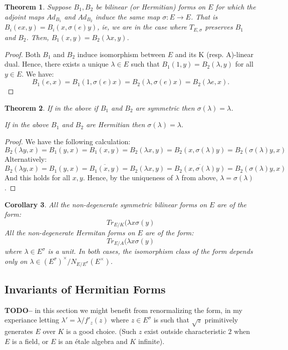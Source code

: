 \documentclass{article}
\theoremstyle{plain}
\newtheorem{theorem}{Theorem}[section]
\newtheorem{corollary}[theorem]{Corollary}
\theoremstyle{definition}
\newcommand{\TODO}[1]{\textbf{TODO-#1}}
\begin{document}
\begin{theorem}
Suppose $B_1,B_2$ be bilinear (or Hermitian) forms on $E$ for which the adjoint maps $Ad_{B_1}$ and $Ad_{B_2}$ induce the same map $\sigma:E\rightarrow E$.
That is $B_i(ex,y) = B_i(x,\sigma(e)y)$, ie, we are in the case where $T_{E,\sigma}$ preserves $B_1$ and $B_2$.
Then, $B_1(x,y) = B_2(\lambda x,y)$.
\end{theorem}
\begin{proof}
Both $B_1$ and $B_2$ induce isomorphism between $E$ and its K (resp. A)-linear dual.
Hence, there exists a unique $\lambda\in E$ such that $B_1(1,y) = B_2(\lambda,y)$ for all $y\in E$.
We have:
\[ B_1(e,x) = B_1(1,\sigma(e)x) = B_2(\lambda,\sigma(e)x) = B_2(\lambda e,x). \]
\end{proof}
\begin{theorem}
If in the above if $B_1$ and $B_2$ are symmetric then $\sigma(\lambda)=\lambda$.

If in the above $B_1$ and $B_2$ are Hermitian then $\sigma(\lambda)=\lambda$.
\end{theorem}
\begin{proof}
We have the following calculation:
\[ B_2(\lambda y,x) = B_1(y,x) = B_1(x,y) = B_2(\lambda x,y) = B_2(x,\sigma(\lambda) y) = B_2(\sigma(\lambda)y,x) \]
Alternatively:
\[ B_2(\lambda y,x) = B_1(y,x) = \overline{B_1(x,y)} = B_2(\lambda x,y) = \overline{B_2(x,\sigma(\lambda) y)} = B_2(\sigma(\lambda)y,x) \]
And this holds for all $x,y$.
Hence, by the uniqueness of $\lambda$ from above, $\lambda=\sigma(\lambda)$.
\end{proof}
\begin{corollary}
All the non-degenerate symmetric bilinear forms on $E$ are of the form:
\[ Tr_{E/K}(\lambda x\sigma(y) \]
All the non-degenerate Hermitan forms on $E$ are of the form:
\[ Tr_{E/A}(\lambda x\sigma(y) \]
where $\lambda \in E^\sigma$ is a unit.
In both cases, the isomorphism class of the form depends only on $\lambda \in (E^\sigma)^\times/N_{E/E^\sigma}(E^\times)$.
\end{corollary}

\subsection{Invariants of Hermitian Forms}

\TODO - in this section we might benefit from renormalizing the form, in my experiance letting $\lambda' = \lambda/f'_z(z)$ where $z\in E^\sigma$ is such that $\sqrt{z}$ primitively generates $E$ over $K$ is a good choice.
(Such $z$ exist outside characteristic $2$ when $E$ is a field, or $E$ is an \'etale algebra and $K$ infinite).
\end{document}
